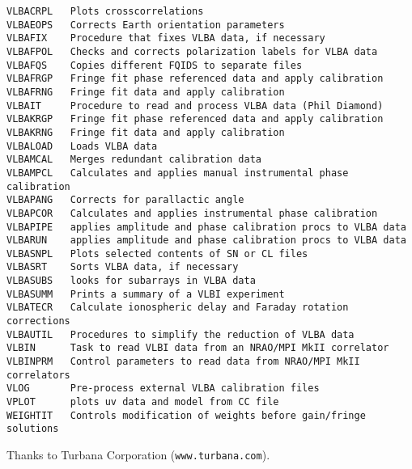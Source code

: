 \begin{verbatim}
VLBACRPL   Plots crosscorrelations
VLBAEOPS   Corrects Earth orientation parameters
VLBAFIX    Procedure that fixes VLBA data, if necessary
VLBAFPOL   Checks and corrects polarization labels for VLBA data
VLBAFQS    Copies different FQIDS to separate files
VLBAFRGP   Fringe fit phase referenced data and apply calibration
VLBAFRNG   Fringe fit data and apply calibration
VLBAIT     Procedure to read and process VLBA data (Phil Diamond)
VLBAKRGP   Fringe fit phase referenced data and apply calibration
VLBAKRNG   Fringe fit data and apply calibration
VLBALOAD   Loads VLBA data
VLBAMCAL   Merges redundant calibration data
VLBAMPCL   Calculates and applies manual instrumental phase calibration
VLBAPANG   Corrects for parallactic angle
VLBAPCOR   Calculates and applies instrumental phase calibration
VLBAPIPE   applies amplitude and phase calibration procs to VLBA data
VLBARUN    applies amplitude and phase calibration procs to VLBA data
VLBASNPL   Plots selected contents of SN or CL files
VLBASRT    Sorts VLBA data, if necessary
VLBASUBS   looks for subarrays in VLBA data
VLBASUMM   Prints a summary of a VLBI experiment
VLBATECR   Calculate ionospheric delay and Faraday rotation corrections
VLBAUTIL   Procedures to simplify the reduction of VLBA data
VLBIN      Task to read VLBI data from an NRAO/MPI MkII correlator
VLBINPRM   Control parameters to read data from NRAO/MPI MkII correlators
VLOG       Pre-process external VLBA calibration files
VPLOT      plots uv data and model from CC file
WEIGHTIT   Controls modification of weights before gain/fringe solutions
\end{verbatim}\eve

\normalsize



\bre
{}
\item[ ]{\hfill Thanks to Turbana Corporation ({\tt www.turbana.com}).}
\ere

